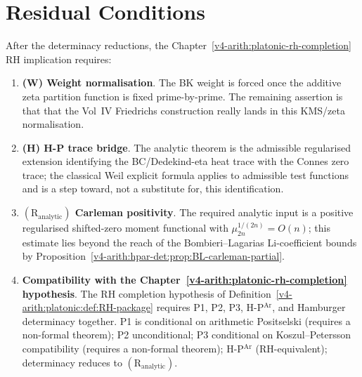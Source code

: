 \section{Residual Conditions}
\label{v4-arith:hpar-det:residuals}

After the determinacy reductions, the Chapter~\ref{v4-arith:platonic-rh-completion} RH implication requires:

\begin{enumerate}
\item \textbf{(W) Weight normalisation}. The BK weight is forced once
the additive zeta partition function is fixed prime-by-prime. The
remaining assertion is that that the Vol~IV Friedrichs construction
really lands in this KMS/zeta normalisation.
\item \textbf{(H) H-P trace bridge}. The analytic theorem is the
admissible regularised extension identifying the BC/Dedekind-eta heat
trace with the Connes zero trace; the classical Weil explicit formula
applies to admissible test functions and is a step toward, not a
substitute for, this identification.
\item \textbf{\((\mathrm{R}_{\mathrm{analytic}})\) Carleman positivity}.
The required analytic input is a positive regularised shifted-zero
moment functional with \(\mu_{2n}^{1/(2n)}=O(n)\); this estimate
lies beyond the reach of the Bombieri--Lagarias Li-coefficient bounds
by Proposition~\ref{v4-arith:hpar-det:prop:BL-carleman-partial}.
\item \textbf{Compatibility with the Chapter~\ref{v4-arith:platonic-rh-completion} hypothesis}. The RH completion
hypothesis of Definition~\ref{v4-arith:platonic:def:RH-package} requires P1, P2,
P3, H-P\(^{\mathrm{Ar}}\), and Hamburger determinacy together. P1 is
conditional on arithmetic Positselski (requires a non-formal theorem); P2
unconditional; P3 conditional on Koszul--Petersson compatibility
(requires a non-formal theorem); H-P\(^{\mathrm{Ar}}\)
(RH-equivalent); determinacy reduces to
\((\mathrm{R}_{\mathrm{analytic}})\).
\end{enumerate}

